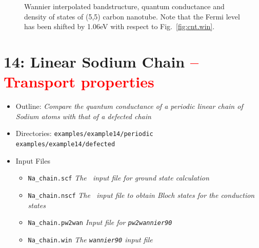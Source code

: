 \documentclass[a4paper,11pt,twoside]{article}
\def\tent#1{\textcolor{red}{#1}}     %
\begin{document}
\begin{figure}[h]
\begin{center}
\caption{Wannier interpolated bandstructure, quantum conductance and
density of states of (5,5) carbon nanotube. Note that the Fermi level has been shifted 
by 1.06eV with respect to Fig.~\ref{fig:cnt.win}.}
\label{fig:cnt.tran}
\end{center}
\end{figure}

\cleardoublepage

\section*{14: Linear Sodium Chain \tent{-- Transport properties}}

\begin{itemize}
  \item{Outline: \it{Compare the quantum conductance of a periodic 
  	linear chain of Sodium atoms with that of a defected chain}}
  \item{\begin{tabbing}
  Directories: \= {\tt examples/example14/periodic}\\ 
    				 \> {\tt examples/example14/defected}
    		\end{tabbing}}
  \item{Input Files}
    \begin{itemize}
      \item{ {\tt Na\_chain.scf}  {\it The \pwscf\ input file for ground state
	  calculation}}
      \item{ {\tt Na\_chain.nscf}  {\it The \pwscf\ input file to obtain Bloch
	  states for the conduction states}} 
      \item{ {\tt Na\_chain.pw2wan}  {\it Input file for {\tt pw2wannier90}}}
      \item{ {\tt Na\_chain.win}  {\it The {\tt wannier90} input file}}
    \end{itemize}
\end{itemize}
\end{document}
